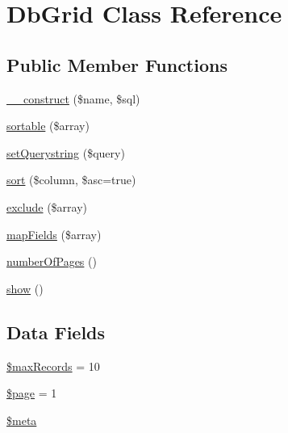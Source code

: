 \hypertarget{class_db_grid}{\section{Db\-Grid Class Reference}
\label{class_db_grid}
}
\subsection*{Public Member Functions}
\begin{DoxyCompactItemize}
\item 
\hyperlink{class_db_grid_acb9a3136ace647e5e0f4512fc88f7c40}{\-\_\-\-\_\-construct} (\$name, \$sql)
\item 
\hyperlink{class_db_grid_aeacb971f985ff1651a2ab65eddb2e210}{sortable} (\$array)
\item 
\hyperlink{class_db_grid_a24266229cb2543d0f438b06cb26fdd7d}{set\-Querystring} (\$query)
\item 
\hyperlink{class_db_grid_ab7abf389a489e98a67891c1451ee3df1}{sort} (\$column, \$asc=true)
\item 
\hyperlink{class_db_grid_a20b391ab095b4f5c1f3ef1bed6977d81}{exclude} (\$array)
\item 
\hyperlink{class_db_grid_a81b2f9024885c83fa1ff9eb0cd534dc2}{map\-Fields} (\$array)
\item 
\hyperlink{class_db_grid_a4f006f9108398d9dc80b0d0ba057b32b}{number\-Of\-Pages} ()
\item 
\hyperlink{class_db_grid_a2b8e3779f5bd8c38f70307574859bd36}{show} ()
\end{DoxyCompactItemize}
\subsection*{Data Fields}
\begin{DoxyCompactItemize}
\item 
\hyperlink{class_db_grid_ad48e2eb22ba0d9bef2ad4d665d9784b2}{\$max\-Records} = 10
\item 
\hyperlink{class_db_grid_a0a44e6760141442bb439b1ab1395d8ff}{\$page} = 1
\item 
\hyperlink{class_db_grid_a9e6fc1ae0498be7d1e682f8bcc9299df}{\$meta}
\end{DoxyCompactItemize}
